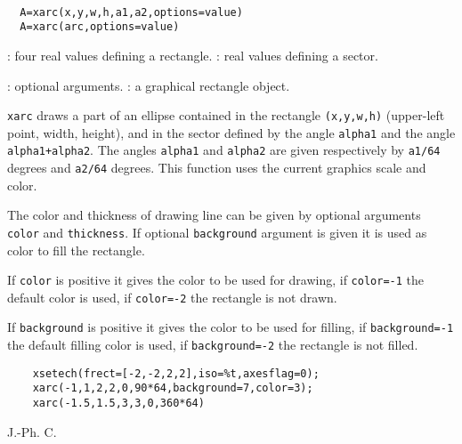 \begin{mandesc}
   \\ %
\end{mandesc}
\begin{calling_sequence}
\begin{verbatim}
  A=xarc(x,y,w,h,a1,a2,options=value)
  A=xarc(arc,options=value)
\end{verbatim}
\end{calling_sequence}
\begin{parameters}
  \begin{varlist}
    : four real values defining a rectangle.
    : real values defining a sector.
    
    : optional arguments.
    : a graphical rectangle object.
  \end{varlist}
\end{parameters}

\begin{mandescription}
  \verb!xarc! draws a part of an ellipse contained in the rectangle 
  \verb!(x,y,w,h)! (upper-left point, width, height), and in the sector 
  defined by the angle \verb!alpha1! and the angle \verb!alpha1+alpha2!. 
  The angles \verb!alpha1! and \verb!alpha2! are 
  given respectively by \verb!a1/64! degrees and \verb!a2/64! degrees.
  This function uses the current graphics scale and color.

  The color and thickness of drawing line can be given by optional arguments
  \verb!color! and \verb!thickness!. If optional \verb!background!
  argument is given it is used as color to fill the rectangle.

  If \verb!color! is positive it gives the color to be used for drawing,
  if \verb!color=-1! the default color is used, if  \verb!color=-2! the
  rectangle is not drawn.

  If \verb!background! is positive it gives the color to be used for filling,
  if \verb!background=-1! the default filling color is used,
  if  \verb!background=-2! the rectangle is not filled.
\end{mandescription}

\begin{examples}
  \begin{Verbatim}
    xsetech(frect=[-2,-2,2,2],iso=%t,axesflag=0);
    xarc(-1,1,2,2,0,90*64,background=7,color=3);
    xarc(-1.5,1.5,3,3,0,360*64)
  \end{Verbatim}
\end{examples}
\begin{manseealso}
     
\end{manseealso}
\begin{authors}
  J.-Ph. C.  
\end{authors}

